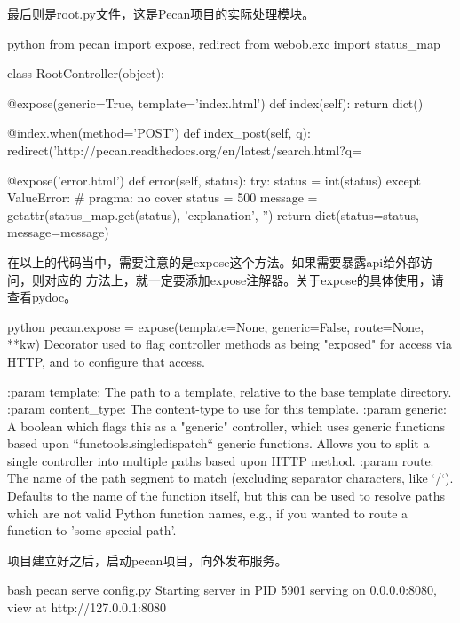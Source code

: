 最后则是root.py文件，这是Pecan项目的实际处理模块。
\begin{code-block}{python}
from pecan import expose, redirect
from webob.exc import status_map


class RootController(object):

    @expose(generic=True, template='index.html')
    def index(self):
        return dict()

    @index.when(method='POST')
    def index_post(self, q):
        redirect('http://pecan.readthedocs.org/en/latest/search.html?q=%

    @expose('error.html')
    def error(self, status):
        try:
            status = int(status)
        except ValueError:  # pragma: no cover
            status = 500
        message = getattr(status_map.get(status), 'explanation', '')
        return dict(status=status, message=message)
\end{code-block}

在以上的代码当中，需要注意的是expose这个方法。如果需要暴露api给外部访问，则对应的
方法上，就一定要添加expose注解器。关于expose的具体使用，请查看pydoc。
\begin{code-block}{python}
pecan.expose = expose(template=None, generic=False, route=None, **kw)
    Decorator used to flag controller methods as being "exposed" for
    access via HTTP, and to configure that access.

    :param template: The path to a template, relative to the base template
                     directory.
    :param content_type: The content-type to use for this template.
    :param generic: A boolean which flags this as a "generic" controller,
                    which uses generic functions based upon
                    ``functools.singledispatch`` generic functions.  Allows you
                    to split a single controller into multiple paths based upon
                    HTTP method.
    :param route: The name of the path segment to match (excluding
                  separator characters, like `/`).  Defaults to the name of
                  the function itself, but this can be used to resolve paths
                  which are not valid Python function names, e.g., if you
                  wanted to route a function to 'some-special-path'.
\end{code-block}

项目建立好之后，启动pecan项目，向外发布服务。
\begin{code-block}{bash}
pecan serve config.py
Starting server in PID 5901
serving on 0.0.0.0:8080, view at http://127.0.0.1:8080
\end{code-block}

